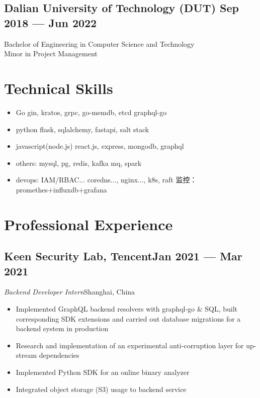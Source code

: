\documentclass[a4,12pt]{article}
\newcommand{\subtext}[1]{
#1\par\vspace{-0.3cm}}
\newenvironment{zitemize}{
\begin{itemize}\itemsep0pt \parskip0pt \parsep1pt}
{\end{itemize}\vspace{-0.5cm}}
\begin{document}
\vspace{-0.3cm}
\subsection*{Dalian University of Technology (DUT) \hfill \textbf{Sep 2018 --- Jun 2022}}
Bachelor of Engineering in Computer Science and Technology\\
Minor in Project Management\\




\vspace{-0.4cm}

\section{\textbf{Technical Skills}}
\begin{zitemize}
    \item Go gin, kratos, grpc, go-memdb, etcd graphql-go
    \item python flask, sqlalchemy, fastapi, salt stack
    \item javascript(node.js) react.js, express, mongodb, graphql
    \item others: mysql, pg, redis, kafka mq, spark
    \item devops: IAM/RBAC... coredns..., nginx..., k8s, raft 监控：promethes+influxdb+grafana
\end{zitemize}

\section{\textbf{Professional Experience}}
        

\subsection*{Keen Security Lab, Tencent\hfill Jan 2021 --- Mar 2021} 
\subtext{\textit{Backend Developer Intern}\hfill Shanghai, China} 
    \begin{zitemize}
        \item Implemented GraphQL backend resolvers with graphql-go \& SQL, built corresponding SDK extensions and carried out database migrations for a backend system in production
        \item Research and implementation of an experimental anti-corruption layer for up-stream dependencies
        \item Implemented Python SDK for an online binary analyzer
        \item Integrated object storage (S3) usage to backend service
    \end{zitemize}
\end{document}

